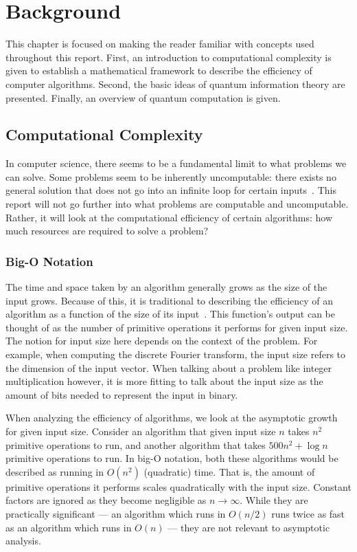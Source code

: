 \chapter{Background} \label{chap:background}
This chapter is focused on making the reader familiar with concepts used throughout this report.
First, an introduction to computational complexity is given to establish a mathematical framework to describe the efficiency of computer algorithms.
Second, the basic ideas of quantum information theory are presented.
Finally, an overview of quantum computation is given.

\section{Computational Complexity}
In computer science, there seems to be a fundamental limit to what problems we can solve.
Some problems seem to be inherently uncomputable: there exists no general solution that does not go into an infinite loop for certain inputs~\cite{church1936note, turing1937computable}.
This report will not go further into what problems are computable and uncomputable.
Rather, it will look at the computational efficiency of certain algorithms: how much resources are required to solve a problem?

\subsection{Big-O Notation}
The time and space taken by an algorithm generally grows as the size of the input grows.
Because of this, it is traditional to describing the efficiency of an algorithm as a function of the size of its input~\cite{cormen2009introduction}.
This function's output can be thought of as the number of primitive operations it performs for given input size.
The notion for input size here depends on the context of the problem.
For example, when computing the discrete Fourier transform, the input size refers to the dimension of the input vector.
When talking about a problem like integer multiplication however, it is more fitting to talk about the input size as the amount of bits needed to represent the input in binary.

When analyzing the efficiency of algorithms, we look at the asymptotic growth for given input size.
Consider an algorithm that given input size $n$ takes $n^2$ primitive operations to run, and another algorithm that takes $500n^2 + \log n$ primitive operations to run.
In big-O notation, both these algorithms would be described as running in $O(n^2)$ (quadratic) time.
That is, the amount of primitive operations it performs scales quadratically with the input size.
Constant factors are ignored as they become negligible as $n \to \infty$.
While they are practically significant --- an algorithm which runs in $O(n/2)$ runs twice as fast as an algorithm which runs in $O(n)$ --- they are not relevant to asymptotic analysis. 

